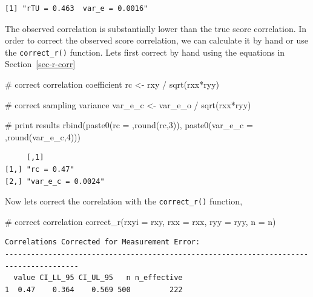 \documentclass[
  letterpaper,
  DIV=11,
  numbers=noendperiod]{scrreprt}
\newenvironment{Shaded}{\begin{snugshade}}{\end{snugshade}}
\newcommand{\AttributeTok}[1]{\textcolor[rgb]{0.40,0.45,0.13}{#1}}
\newcommand{\CommentTok}[1]{\textcolor[rgb]{0.37,0.37,0.37}{#1}}
\newcommand{\DecValTok}[1]{\textcolor[rgb]{0.68,0.00,0.00}{#1}}
\newcommand{\FunctionTok}[1]{\textcolor[rgb]{0.28,0.35,0.67}{#1}}
\newcommand{\NormalTok}[1]{\textcolor[rgb]{0.00,0.23,0.31}{#1}}
\newcommand{\OtherTok}[1]{\textcolor[rgb]{0.00,0.23,0.31}{#1}}
\newcommand{\SpecialCharTok}[1]{\textcolor[rgb]{0.37,0.37,0.37}{#1}}
\newcommand{\StringTok}[1]{\textcolor[rgb]{0.13,0.47,0.30}{#1}}
\begin{document}
\begin{verbatim}
[1] "rTU = 0.463  var_e = 0.0016"
\end{verbatim}

The observed correlation is substantially lower than the true score
correlation. In order to correct the observed score correlation, we can
calculate it by hand or use the \texttt{correct\_r()} function. Lets
first correct by hand using the equations in Section~\ref{sec-r-corr}

\begin{Shaded}
\begin{Highlighting}[]
\CommentTok{\# correct correlation coefficient}
\NormalTok{rc }\OtherTok{\textless{}{-}}\NormalTok{ rxy }\SpecialCharTok{/} \FunctionTok{sqrt}\NormalTok{(rxx}\SpecialCharTok{*}\NormalTok{ryy)}

\CommentTok{\# correct sampling variance}
\NormalTok{var\_e\_c }\OtherTok{\textless{}{-}}\NormalTok{ var\_e\_o }\SpecialCharTok{/} \FunctionTok{sqrt}\NormalTok{(rxx}\SpecialCharTok{*}\NormalTok{ryy)}

\CommentTok{\# print results}
\FunctionTok{rbind}\NormalTok{(}\FunctionTok{paste0}\NormalTok{(}\StringTok{\textquotesingle{}rc = \textquotesingle{}}\NormalTok{,}\FunctionTok{round}\NormalTok{(rc,}\DecValTok{3}\NormalTok{)),}
      \FunctionTok{paste0}\NormalTok{(}\StringTok{\textquotesingle{}var\_e\_c = \textquotesingle{}}\NormalTok{,}\FunctionTok{round}\NormalTok{(var\_e\_c,}\DecValTok{4}\NormalTok{)))}
\end{Highlighting}
\end{Shaded}

\begin{verbatim}
     [,1]              
[1,] "rc = 0.47"       
[2,] "var_e_c = 0.0024"
\end{verbatim}

Now lets correct the correlation with the \texttt{correct\_r()}
function,

\begin{Shaded}
\begin{Highlighting}[]
\CommentTok{\# correct correlation}
\FunctionTok{correct\_r}\NormalTok{(}\AttributeTok{rxyi =}\NormalTok{ rxy,}
          \AttributeTok{rxx =}\NormalTok{ rxx,}
          \AttributeTok{ryy =}\NormalTok{ ryy,}
          \AttributeTok{n =}\NormalTok{ n)}
\end{Highlighting}
\end{Shaded}

\begin{verbatim}
Correlations Corrected for Measurement Error:
---------------------------------------------------------------------------------------
  value CI_LL_95 CI_UL_95   n n_effective
1  0.47    0.364    0.569 500         222
\end{verbatim}
\end{document}
